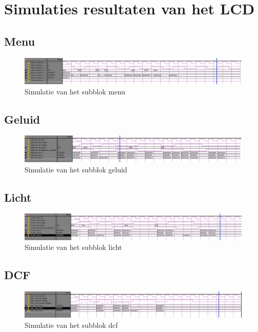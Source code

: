 \chapter[Simulatie resultaten LCD]{Simulaties resultaten van het LCD}
\label{Ap:sim_LCD}
\section{Menu}
\begin{figure}[h!]
\includegraphics[width=\textwidth,height=\textheight,keepaspectratio]{Figuren/LCD/resultaten/menu.jpg}
\caption{Simulatie van het subblok menu}
\label{fig:simmenu}
\end{figure}
\section{Geluid}
\begin{figure}[h!]
\includegraphics[width=\textwidth,height=\textheight,keepaspectratio]{Figuren/LCD/resultaten/geluid.jpg}
\caption{Simulatie van het subblok geluid}
\label{fig:simgeluid}
\end{figure}
\section{Licht}
\begin{figure}[h!]
\includegraphics[width=\textwidth,height=\textheight,keepaspectratio]{Figuren/LCD/resultaten/licht.jpg}
\caption{Simulatie van het subblok licht}
\label{fig:simlicht}
\end{figure}
\section{DCF}
\begin{figure}[h!]
\includegraphics[width=\textwidth,height=\textheight,keepaspectratio]{Figuren/LCD/resultaten/dcf.jpg}
\caption{Simulatie van het subblok dcf}
\label{fig:simdcf}
\end{figure}

